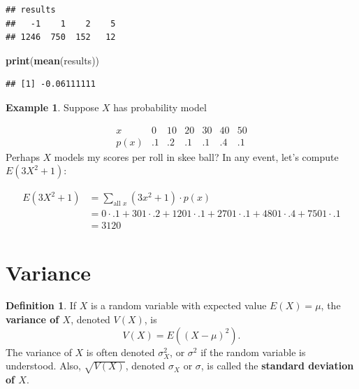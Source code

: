 \documentclass[
]{book}
\newenvironment{Shaded}{\begin{snugshade}}{\end{snugshade}}
\newcommand{\FunctionTok}[1]{\textcolor[rgb]{0.13,0.29,0.53}{\textbf{#1}}}
\newcommand{\NormalTok}[1]{#1}
\theoremstyle{definition}
\newtheorem{definition}{Definition}[chapter]
\theoremstyle{definition}
\newtheorem{example}{Example}[chapter]
\theoremstyle{definition}
\theoremstyle{definition}
\theoremstyle{remark}
\begin{document}
\begin{verbatim}
## results
##   -1    1    2    5 
## 1246  750  152   12
\end{verbatim}

\begin{Shaded}
\begin{Highlighting}[]
\FunctionTok{print}\NormalTok{(}\FunctionTok{mean}\NormalTok{(results))}
\end{Highlighting}
\end{Shaded}

\begin{verbatim}
## [1] -0.06111111
\end{verbatim}

\begin{example}
Suppose \(X\) has probability model

\[
\begin{array}{c|c|c|c|c|c|c}
x & 0 & 10 & 20 & 30 & 40 & 50\\ \hline
p(x) & .1 & .2 & .1 & .1 & .4 & .1  
\end{array}
\]
Perhaps \(X\) models my scores per roll in skee ball? In any event, let's compute \(E(3X^2 + 1)\):

\begin{align*}
E(3X^2 + 1) &= \sum_{\text{all }x} (3x^2 + 1)\cdot p(x)\\
&= 0 \cdot .1 + 301\cdot .2 + 1201\cdot .1 + 2701 \cdot .1 + 4801 \cdot .4 + 7501 \cdot .1\\
&= 3120
\end{align*}
\end{example}

\section{Variance}\label{variance}

\begin{definition}
\protect\hypertarget{def:variance-discrete}{}\label{def:variance-discrete}If \(X\) is a random variable with expected value \(E(X) = \mu\), the \textbf{variance of \(X\)}, denoted \(V(X)\), is \[V(X) = E((X-\mu)^2).\]
The variance of \(X\) is often denoted \(\sigma^2_X\), or \(\sigma^2\) if the random variable is understood. Also, \(\sqrt{V(X)}\), denoted \(\sigma_X\) or \(\sigma\), is called the \textbf{standard deviation of \(X\)}.
\end{definition}
\end{document}
